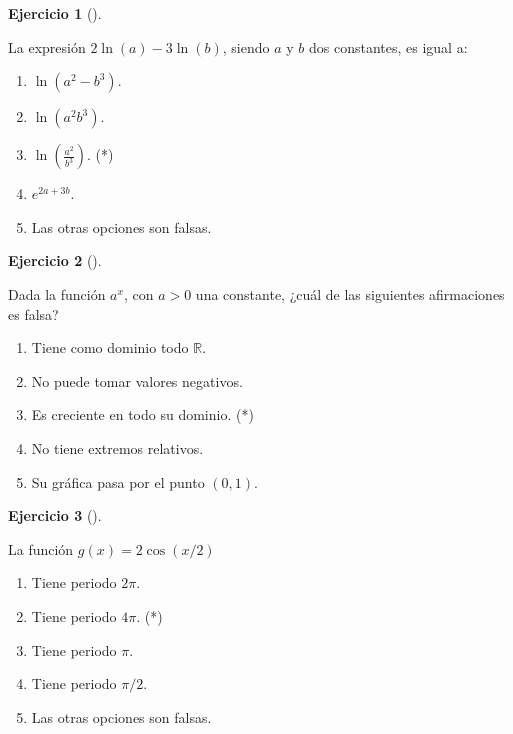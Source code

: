 \documentclass[
  a4paper,
]{scrreport}
\theoremstyle{definition}
\newtheorem{exercise}{Ejercicio}[chapter]
\theoremstyle{remark}
\begin{document}
\begin{exercise}[]\protect\hypertarget{exr-13}{}\label{exr-13}

La expresión \(2\ln(a)-3\ln(b)\), siendo \(a\) y \(b\) dos constantes,
es igual a:

\begin{enumerate}
\def\labelenumi{\alph{enumi}.}
\item
  \(\ln(a^2-b^3)\).
\item
  \(\ln(a^2b^3)\).
\item
  \(\ln\left(\frac{a^2}{b^3}\right)\). (*)
\item
  \(e^{2a+3b}\).
\item
  Las otras opciones son falsas.
\end{enumerate}

\end{exercise}

\begin{exercise}[]\protect\hypertarget{exr-14}{}\label{exr-14}

Dada la función \(a^x\), con \(a>0\) una constante, ¿cuál de las
siguientes afirmaciones es falsa?

\begin{enumerate}
\def\labelenumi{\alph{enumi}.}
\item
  Tiene como dominio todo \(\mathbb{R}\).
\item
  No puede tomar valores negativos.
\item
  Es creciente en todo su dominio. (*)
\item
  No tiene extremos relativos.
\item
  Su gráfica pasa por el punto \((0,1)\).
\end{enumerate}

\end{exercise}

\begin{exercise}[]\protect\hypertarget{exr-15}{}\label{exr-15}

La función \(g(x)= 2\cos(x/2)\)

\begin{enumerate}
\def\labelenumi{\alph{enumi}.}
\item
  Tiene periodo \(2\pi\).
\item
  Tiene periodo \(4\pi\). (*)
\item
  Tiene periodo \(\pi\).
\item
  Tiene periodo \(\pi/2\).
\item
  Las otras opciones son falsas.
\end{enumerate}

\end{exercise}
\end{document}
